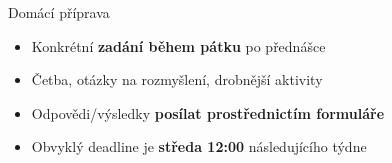 \documentclass[aspectratio=169,dvipsnames]{beamer}
\begin{document}
\begin{frame}{Domácí příprava}

    \begin{itemize}[<+->]

        \item Konkrétní \textbf{zadání během pátku} po přednášce

        \item Četba, otázky na rozmyšlení, drobnější aktivity

        \item Odpovědi/výsledky \textbf{posílat prostřednictím formuláře}

        \item Obvyklý deadline je \textbf{středa 12:00} následujícího týdne

    \end{itemize}

    \vspace{10pt}

    \centering

\end{frame}


%
%
%
%
%
%

%
\end{document}

